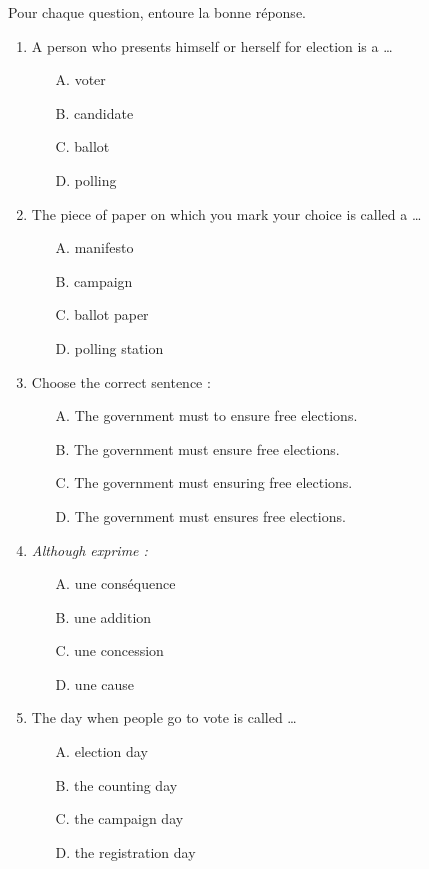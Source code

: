 \documentclass[11pt]{article}
\newcommand{\eng}[1]{\ifmmode\text{\textit{#1}}\else\begingroup\selectlanguage{english}\itshape #1\endgroup\fi}
\begin{document}
\begin{exercice}
Pour chaque question, entoure la bonne réponse.
\begin{enumerate}
\item A person who presents himself or herself for election is a \ldots
\begin{itemize}
\item[A.] voter \item[B.] candidate \item[C.] ballot \item[D.] polling
\end{itemize}
\item The piece of paper on which you mark your choice is called a \ldots
\begin{itemize}
\item[A.] manifesto \item[B.] campaign \item[C.] ballot paper \item[D.] polling station
\end{itemize}
\item Choose the correct sentence :
\begin{itemize}
\item[A.] The government must to ensure free elections.
\item[B.] The government must ensure free elections.
\item[C.] The government must ensuring free elections.
\item[D.] The government must ensures free elections.
\end{itemize}
\item \eng{Although} exprime :
\begin{itemize}
\item[A.] une conséquence \item[B.] une addition \item[C.] une concession \item[D.] une cause
\end{itemize}
\item The day when people go to vote is called \ldots
\begin{itemize}
\item[A.] election day \item[B.] the counting day \item[C.] the campaign day \item[D.] the registration day
\end{itemize}
\end{enumerate}
\end{exercice}
\end{document}
